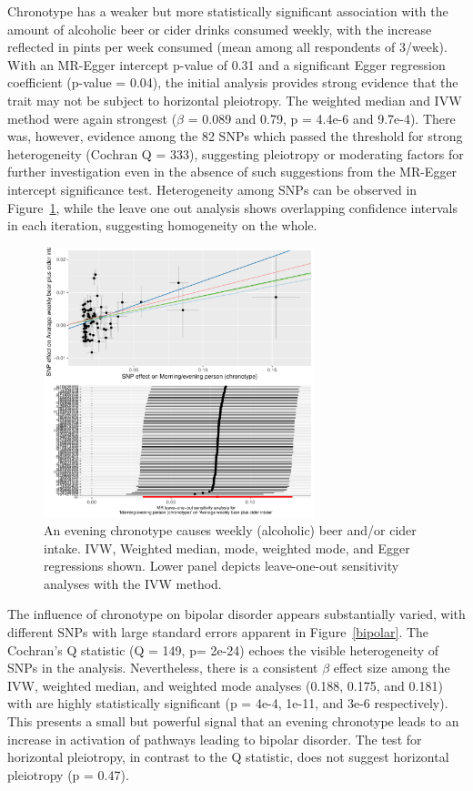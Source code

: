 \documentclass[journal,article,submit,moreauthors,pdftex]{Definitions/mdpi}
\begin{document}
Chronotype has a weaker but more statistically significant association with the amount of alcoholic beer or cider drinks consumed weekly, with the increase reflected in pints per week consumed (mean among all respondents of 3/week). With an MR-Egger intercept p-value of 0.31 and a significant Egger regression coefficient (p-value = 0.04), the initial analysis provides strong evidence that the trait may not be subject to horizontal pleiotropy. The weighted median and IVW method were again strongest ($\beta$ = 0.089 and 0.79, p = 4.4e-6 and 9.7e-4). There was, however, evidence among the 82 SNPs which passed the threshold for strong heterogeneity (Cochran Q = 333), suggesting pleiotropy or moderating factors for further investigation even in the absence of such suggestions from the MR-Egger intercept significance test. Heterogeneity among SNPs can be observed in Figure~\ref{beer}, while the leave one out analysis shows overlapping confidence intervals in each iteration, suggesting homogeneity on the whole.

\begin{figure}[htbp]
	\centering
         \includegraphics[width=0.7\textwidth]{Figs/Analysis2/Morning_evening_person_(chronotype)_vs_Average_weekly_beer_plus_cider_intake.Plots.pdf}
    \caption{An evening chronotype causes weekly (alcoholic) beer and/or cider intake. IVW, Weighted median, mode, weighted mode, and Egger regressions shown. Lower panel depicts leave-one-out sensitivity analyses with the IVW method.}
	\label{beer}
\end{figure}

The influence of chronotype on bipolar disorder appears substantially varied, with different SNPs with large standard errors apparent in Figure~\ref{bipolar}. The Cochran's Q statistic (Q = 149, p= 2e-24) echoes the visible heterogeneity of SNPs in the analysis. Nevertheless, there is a consistent $\beta$ effect size among the IVW, weighted median, and weighted mode analyses (0.188, 0.175, and 0.181) with are highly statistically significant (p = 4e-4, 1e-11, and 3e-6 respectively). This presents a small but powerful signal that an evening chronotype leads to an increase in activation of pathways leading to bipolar disorder. The test for horizontal pleiotropy, in contrast to the Q statistic, does not suggest horizontal pleiotropy (p = 0.47).
\end{document}

